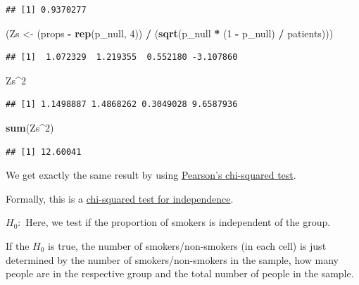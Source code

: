 \documentclass[
]{book}
\newenvironment{Shaded}{\begin{snugshade}}{\end{snugshade}}
\newcommand{\DecValTok}[1]{\textcolor[rgb]{0.00,0.00,0.81}{#1}}
\newcommand{\FunctionTok}[1]{\textcolor[rgb]{0.13,0.29,0.53}{\textbf{#1}}}
\newcommand{\NormalTok}[1]{#1}
\newcommand{\OtherTok}[1]{\textcolor[rgb]{0.56,0.35,0.01}{#1}}
\newcommand{\SpecialCharTok}[1]{\textcolor[rgb]{0.81,0.36,0.00}{\textbf{#1}}}
\begin{document}
\begin{verbatim}
## [1] 0.9370277
\end{verbatim}

\begin{Shaded}
\begin{Highlighting}[]
\NormalTok{(Zs }\OtherTok{\textless{}{-}}\NormalTok{ (props }\SpecialCharTok{{-}} \FunctionTok{rep}\NormalTok{(p\_null, }\DecValTok{4}\NormalTok{)) }\SpecialCharTok{/}\NormalTok{ (}\FunctionTok{sqrt}\NormalTok{(p\_null }\SpecialCharTok{*}\NormalTok{ (}\DecValTok{1} \SpecialCharTok{{-}}\NormalTok{ p\_null) }\SpecialCharTok{/}\NormalTok{ patients)))}
\end{Highlighting}
\end{Shaded}

\begin{verbatim}
## [1]  1.072329  1.219355  0.552180 -3.107860
\end{verbatim}

\begin{Shaded}
\begin{Highlighting}[]
\NormalTok{Zs}\SpecialCharTok{\^{}}\DecValTok{2}
\end{Highlighting}
\end{Shaded}

\begin{verbatim}
## [1] 1.1498887 1.4868262 0.3049028 9.6587936
\end{verbatim}

\begin{Shaded}
\begin{Highlighting}[]
\FunctionTok{sum}\NormalTok{(Zs}\SpecialCharTok{\^{}}\DecValTok{2}\NormalTok{)}
\end{Highlighting}
\end{Shaded}

\begin{verbatim}
## [1] 12.60041
\end{verbatim}

We get exactly the same result by using
\href{https://en.wikipedia.org/wiki/Pearson\%27s_chi-squared_test}{Pearson's chi-squared test}.

Formally, this is a \href{https://en.wikipedia.org/wiki/Chi-squared_test\#Test_of_independence}{chi-squared test for independence}.

\(H_0:\) Here, we test if the proportion of smokers is independent of the group.

If the \(H_0\) is true, the number of smokers/non-smokers (in each cell) is just determined
by the number of smokers/non-smokers
in the sample, how many people are in the respective group and the total number
of people in the sample.
\end{document}
